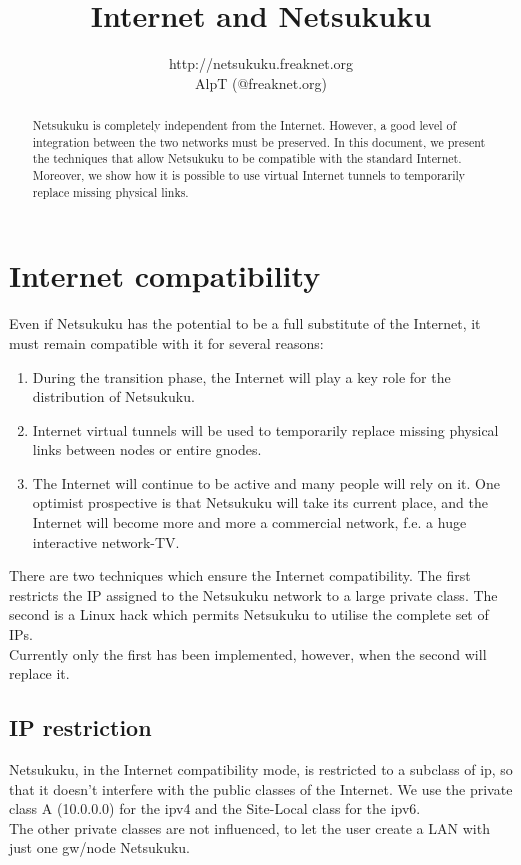 \documentclass[a4paper]{article}
\title{Internet and Netsukuku}
\author{http://netsukuku.freaknet.org\\AlpT (@freaknet.org)}
\begin{document}
\maketitle

\begin{abstract}
	Netsukuku is completely independent from the Internet. However, a good
	level of integration between the two networks must be preserved.
	In this document, we present the techniques that allow Netsukuku to be
	compatible with the standard Internet. Moreover, we show how it is
	possible to use virtual Internet tunnels to temporarily replace missing
	physical links.
\end{abstract}

\section{Internet compatibility}
Even if Netsukuku has the potential to be a full substitute of the Internet,
it must remain compatible with it for several reasons:
\begin{enumerate}
	\item During the transition phase, the Internet will play a key role
		for the distribution of Netsukuku.
	\item Internet virtual tunnels will be used to temporarily replace
		missing physical links between nodes or entire gnodes.
	\item The Internet will continue to be active and many people will
		rely on it. One optimist prospective is that Netsukuku will
		take its current place, and the Internet will become more and
		more a commercial network, f.e. a huge interactive network-TV.
\end{enumerate}
There are two techniques which ensure the Internet compatibility.
The first restricts the IP assigned to the Netsukuku network to a large
private class. The second is a Linux hack which permits Netsukuku to utilise
the complete set of IPs.\\
Currently only the first has been implemented, however, when the second will
replace it.

\subsection{IP restriction}

Netsukuku, in the Internet compatibility mode, is restricted to a subclass of
ip, so that it doesn't interfere with the public classes of the Internet.
We use the private class A (10.0.0.0) for the ipv4 and the Site-Local class for the
ipv6.\\
The other private classes are not influenced, to let the user create a LAN
with just one gw/node Netsukuku.
\end{document}
